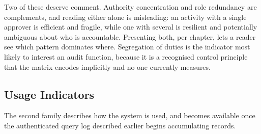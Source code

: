 Two of these deserve comment. Authority concentration and role redundancy are complements, and reading either alone is misleading: an activity with a single approver is efficient and fragile, while one with several is resilient and potentially ambiguous about who is accountable. Presenting both, per chapter, lets a reader see which pattern dominates where. Segregation of duties is the indicator most likely to interest an audit function, because it is a recognised control principle that the matrix encodes implicitly and no one currently measures.

\subsection{Usage Indicators}
\label{sec:usagekpi}

The second family describes how the system is used, and becomes available once the authenticated query log described earlier begins accumulating records.

